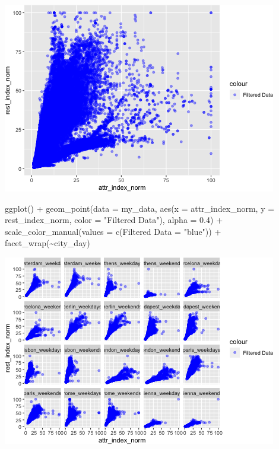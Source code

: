 \documentclass[
]{article}
\newenvironment{Shaded}{\begin{snugshade}}{\end{snugshade}}
\newcommand{\AttributeTok}[1]{\textcolor[rgb]{0.77,0.63,0.00}{#1}}
\newcommand{\FloatTok}[1]{\textcolor[rgb]{0.00,0.00,0.81}{#1}}
\newcommand{\FunctionTok}[1]{\textcolor[rgb]{0.00,0.00,0.00}{#1}}
\newcommand{\NormalTok}[1]{#1}
\newcommand{\OtherTok}[1]{\textcolor[rgb]{0.56,0.35,0.01}{#1}}
\newcommand{\SpecialCharTok}[1]{\textcolor[rgb]{0.00,0.00,0.00}{#1}}
\newcommand{\StringTok}[1]{\textcolor[rgb]{0.31,0.60,0.02}{#1}}
\begin{document}
\includegraphics{Project_files/figure-latex/unnamed-chunk-34-3.png}

\begin{Shaded}
\begin{Highlighting}[]
\FunctionTok{ggplot}\NormalTok{() }\SpecialCharTok{+} \FunctionTok{geom\_point}\NormalTok{(}\AttributeTok{data =}\NormalTok{ my\_data, }\FunctionTok{aes}\NormalTok{(}\AttributeTok{x =}\NormalTok{ attr\_index\_norm,}
    \AttributeTok{y =}\NormalTok{ rest\_index\_norm, }\AttributeTok{color =} \StringTok{"Filtered Data"}\NormalTok{), }\AttributeTok{alpha =} \FloatTok{0.4}\NormalTok{) }\SpecialCharTok{+}
    \FunctionTok{scale\_color\_manual}\NormalTok{(}\AttributeTok{values =} \FunctionTok{c}\NormalTok{(}\StringTok{\textasciigrave{}}\AttributeTok{Filtered Data}\StringTok{\textasciigrave{}} \OtherTok{=} \StringTok{"blue"}\NormalTok{)) }\SpecialCharTok{+}
    \FunctionTok{facet\_wrap}\NormalTok{(}\SpecialCharTok{\textasciitilde{}}\NormalTok{city\_day)}
\end{Highlighting}
\end{Shaded}

\includegraphics{Project_files/figure-latex/unnamed-chunk-34-4.png}
\end{document}
